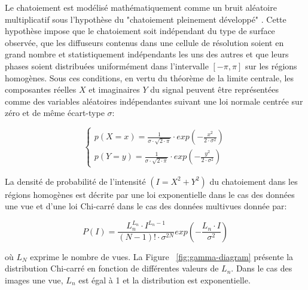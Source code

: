 Le chatoiement est modélisé mathématiquement comme un bruit aléatoire multiplicatif sous l'hypothèse du "chatoiement pleinement développé" \cite{Goodman76}. Cette hypothèse impose que le chatoiement soit indépendant du type de surface observée, que les diffuseurs contenus dans une cellule de résolution soient en grand nombre et statistiquement indépendants les uns des autres et que leurs phases soient distribuées uniformément dans l’intervalle $[-\pi, \pi]$ sur les régions homogènes. Sous ces conditions, en vertu du théorème de la limite centrale, les composantes réelles $X$ et imaginaires $Y$ du signal peuvent être représentées comme  des variables aléatoires indépendantes suivant une loi normale centrée sur zéro et de même écart-type $\sigma$:

\begin{equation}
  \left\{
    \begin{aligned}
        p(X=x) = \frac{1}{\sigma\cdot\sqrt{2\cdot\pi}}\cdot exp(-\frac{x^2}{2\cdot\sigma^2})  \\
        p(Y=y) = \frac{1}{\sigma\cdot\sqrt{2\cdot\pi}}\cdot exp(-\frac{y^2}{2\cdot\sigma^2})
    \end{aligned}
  \right.
\end{equation}

La densité de probabilité de l'intensité $(I=X^2+Y^2)$ du chatoiement dans les régions homogènes est décrite par une loi exponentielle dans le cas des données une vue et d'une loi Chi-carré dans le cas des données multivues donnée par:

\begin{equation}
    P(I) =\frac{L_n^{L_n}\cdot I^{L_n-1}}{(N-1)! \cdot \sigma^{2N}} exp(-\frac{L_n \cdot I}{\sigma^2})
\end{equation}

\vspace{10pt}

où $L_N$ exprime le nombre de vues. La Figure  ~\ref{fig:gamma-diagram} présente la distribution Chi-carré en fonction de différentes valeurs de $L_n$. Dans le cas des images une vue, $L_n$ est égal à 1 et la distribution est exponentielle. 

